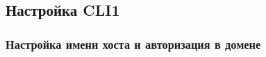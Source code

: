 \documentclass[a4paper, 12pt]{report}
\begin{document}
	\begin{figure}[h]
		\label{fig:image}
	\end{figure}

	\clearpage

	\subsection{Настройка CLI1}
	
	\subsubsection{Настройка имени хоста и авторизация в домене}
	
	\begin{figure}[h]
		\label{fig:image}
	\end{figure}
\end{document}
